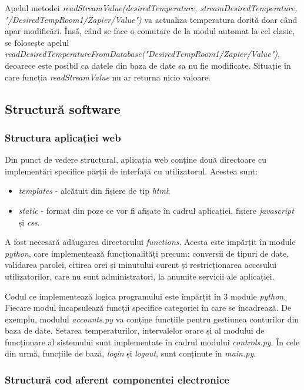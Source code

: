 	Apelul metodei \textit{readStreamValue(desiredTemperature, streamDesiredTemperature, "/DesiredTempRoom1/Zapier/Value")} va actualiza temperatura dorită doar când apar modificări. Însă, când se face o comutare de la modul automat la cel clasic, se folosește apelul \textit{readDesiredTemperatureFromDatabase("DesiredTempRoom1/Zapier/Value")}, deoarece este posibil ca datele din baza de date sa nu fie modificate. Situație în care funcția \textit{readStreamValue} nu ar returna nicio valoare.

\subsection{Structură software}

\subsubsection{Structura aplicației web}

	Din punct de vedere structural, aplicația web conține două directoare cu implementări specifice părții de interfață cu utilizatorul. Acestea sunt:
	\begin{itemize}
		\setlength{\itemindent}{2em}
			\itemsep0em
			\item \textit{templates} - alcătuit din fișiere de tip \textit{html};
			\item \textit{static} - format din poze ce vor fi afișate în cadrul aplicației, fișiere \textit{javascript} și \textit{css}.
	\end{itemize}

	A fost necesară adăugarea directorului \textit{functions}. Acesta este impărțit în module \textit{python}, care implementează funcționalități precum: conversii de tipuri de date, validarea parolei, citirea orei și minutului curent și restricționarea accesului utilizatorilor, care nu sunt administratori, la anumite servicii ale aplicației.

	Codul ce implementează logica programului este împărțit în 3 module \textit{python}. Fiecare modul încapsulează funcții specifice categoriei în care se încadrează. De exemplu, modulul \textit{accounts.py} va conține funcțiile pentru gestiunea conturilor din baza de date. Setarea temperaturilor, intervalelor orare și al modului de funcționare al sistemului sunt implementate în cadrul modului \textit{controls.py}. În cele din urmă, funcțiile de bază, \textit{login} și \textit{logout}, sunt conținute în \textit{main.py}.     
	 
\subsubsection{Structură cod aferent componentei electronice}
	
